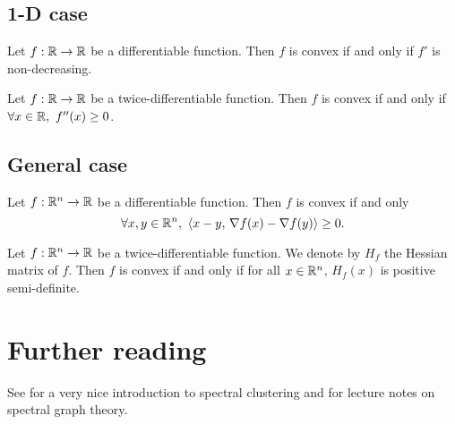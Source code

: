 \documentclass[11pt,nocut]{article}
\begin{document}
\subsection{1-D case}

\begin{proposition}
	Let $f: \mathbb{R} \to \mathbb{R}$ be a differentiable function. Then $f$ is convex if and only if $f'$ is non-decreasing.
\end{proposition}

\begin{proposition}
	Let $f: \mathbb{R} \to \mathbb{R}$ be a twice-differentiable function. Then $f$ is convex if and only if $\forall x \in \R,\ f''(x) \geq 0$.
\end{proposition}

\subsection{General case}

\begin{proposition}
	Let $f: \mathbb{R}^n \to \mathbb{R}$ be a differentiable function. Then $f$ is convex if and only 
	$$
	\forall x,y \in \mathbb{R}^n, \
	\langle x - y, \, \nabla f(x) - \nabla f(y) \rangle \geq 0.
	$$
\end{proposition}

\begin{proposition}
	Let $f: \mathbb{R}^n \to \mathbb{R}$ be a twice-differentiable function. We denote by $H_f$ the Hessian matrix of $f$.
	Then $f$ is convex if and only if for all $x \in \mathbb{R}^n$, $H_f(x)$ is positive semi-definite.
\end{proposition}

\section*{Further reading}

See \cite{von2007tutorial} for a very nice introduction to spectral clustering and \cite{spielman2012spectral} for lecture notes on spectral graph theory.

\vspace{1cm}
\centerline{}




\end{document}
